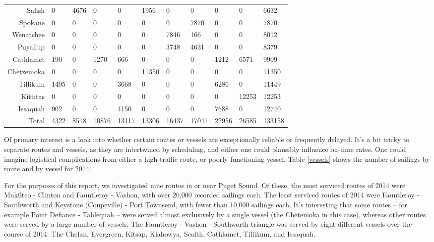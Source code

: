 \documentclass[11pt, letterpaper]{article}
\begin{document}
{\begin{landscape}
{\begin{tabular}{ | r | p{2cm} | p{1.6cm} | p{1.8cm} | p{1.9cm} | p{1.8cm} | p{1.9cm} | p{1.7cm} | p{1.7cm} | p{1.7cm} | p{1cm} |}
  Salish & 0 & 4676 & 0 & 0 & 1956 & 0 & 0 & 0 & 0 & 6632 \\ 
  Spokane & 0 & 0 & 0 & 0 & 0 & 0 & 7870 & 0 & 0 & 7870 \\ 
  Wenatchee & 0 & 0 & 0 & 0 & 0 & 7846 & 166 & 0 & 0 & 8012 \\ 
  Puyallup & 0 & 0 & 0 & 0 & 0 & 3748 & 4631 & 0 & 0 & 8379 \\ 
  Cathlamet & 190 & 0 & 1270 & 666 & 0 & 0 & 0 & 1212 & 6571 & 9909 \\ 
  Chetzemoka & 0 & 0 & 0 & 0 & 11350 & 0 & 0 & 0 & 0 & 11350 \\ 
  Tillikum & 1495 & 0 & 0 & 3668 & 0 & 0 & 0 & 6286 & 0 & 11449 \\ 
  Kittitas & 0 & 0 & 0 & 0 & 0 & 0 & 0 & 0 & 12253 & 12253 \\ 
  Issaquah & 902 & 0 & 0 & 4150 & 0 & 0 & 0 & 7688 & 0 & 12740 \\ 
\hline
   Total & 4322 & 8518 & 10876 & 13117 & 13306 & 16437 & 17041 & 22956 & 26585 & 133158 \\ 
   \hline
\end{tabular}
}

    \end{landscape}
    \clearpage%
}

Of primary interest is a look into whether certain routes or vessels are exceptionally reliable or frequently delayed. It's a bit tricky to separate routes and vessels, as they are intertwined by scheduling, and either one could plausibly influence on-time rates. One could imagine logistical complications from either a high-traffic route, or poorly functioning vessel. Table \ref{vessels} shows the number of sailings by route and by vessel for 2014. 

For the purposes of this report, we investigated nine routes in or near Puget Sound. Of these, the most serviced routes of 2014 were Mukilteo - Clinton and Fauntleroy - Vashon, with over 20,000 recorded sailings each. The least serviced routes of 2014 were Fauntleroy - Southworth and Keystone (Coupeville) - Port Townsend, with fewer than 10,000 sailings each. It's interesting that some routes -- for example Point Defiance - Tahlequah -- were served almost exclusively by a single vessel (the Chetemoka in this case), whereas other routes were served by a large number of vessels. The Fauntleroy - Vashon - Southworth triangle was served by eight different vessels over the course of 2014: The Chelan, Evergreen, Kitsap, Klahowya, Sealth, Cathlamet, Tillikum, and Issaquah.
\end{document}
